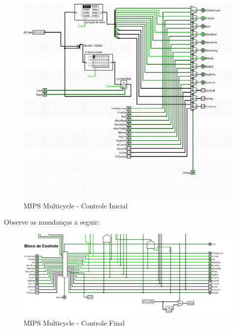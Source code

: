 \documentclass{report}
\begin{document}
        \begin{figure}[h!]
            \centering
            \includegraphics[width=\linewidth]{images/prints/Multicycle/Bloco de Controle Multicycle Antes.png}
            \caption{\label{print:Controle Inicial} MIPS Multicycle - Controle Inicial}
        \end{figure}

        \clearpage
        Observe as mundanças a seguir:
        \begin{figure}[h!]
            \centering
            \includegraphics[width=\linewidth]{images/prints/Multicycle/Bloco de Controle Multicycle Depois.png}
            \caption{\label{print:Controle Final} MIPS Multicycle - Controle Final}
        \end{figure}

        
\end{document}

